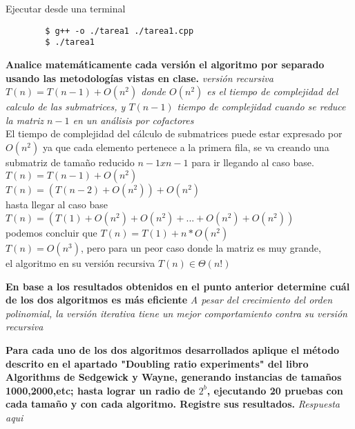 \documentclass{article}
\begin{document}
Ejecutar desde una terminal

\begin{commandline}
	\begin{verbatim}
		$ g++ -o ./tarea1 ./tarea1.cpp
		$ ./tarea1
	\end{verbatim}
\end{commandline}

\begin{question}
  \textbf{Analice matemáticamente cada versión el algoritmo por separado usando las metodologías vistas en clase.}
  \textit{versión recursiva $T(n) = T(n-1) + O(n^{2})$ donde $O(n^{2})$ es el tiempo de complejidad del calculo de las submatrices, y $T(n-1)$ tiempo de complejidad cuando se reduce la matriz $n-1$ en un análisis por cofactores}\\
  El tiempo de complejidad del cálculo de submatrices puede estar expresado por $O(n^{2})$ ya que cada elemento pertenece a la primera fila, se va creando una submatriz de tamaño reducido $n-1 x n-1$ para ir llegando al caso base.\\
  $T(n) = T(n-1)+O(n^{2})$\\
  $T(n) = (T(n-2)+ O(n^{2}))+O(n^{2})$\\
  hasta llegar al caso base\\
  $T(n) = (T(1) + O(n^{2})+O(n^{2})+...+O(n^{2})+O(n^{2}))$\\
  podemos concluir que $T(n) = T(1) + n*O(n^{2})$\\
  $T(n) = O(n^{3})$, pero para un peor caso donde la matriz es muy grande, \\el algoritmo en su versión recursiva $T(n) \in \Theta(n!)$

  

\end{question}

\begin{question}
  \textbf{En base a los resultados obtenidos en el punto anterior determine cuál de los dos algoritmos es más eficiente}
  \textit{A pesar del crecimiento del orden polinomial, la versión iterativa tiene un mejor comportamiento contra su versión recursiva}
\end{question}

\begin{question}
  \textbf{Para cada uno de los dos algoritmos desarrollados aplique el método descrito en el apartado "Doubling ratio experiments" del libro Algorithms de Sedgewick y Wayne, generando instancias de tamaños 1000,2000,etc; hasta lograr un radio de $2^{b}$, ejecutando 20 pruebas con cada tamaño y con cada algoritmo. Registre sus resultados.}
  \textit{Respuesta aqui}
\end{question}
\end{document}
